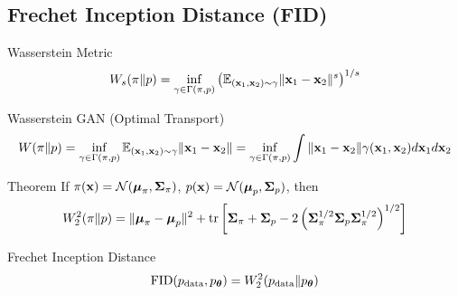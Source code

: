 \documentclass{beamer}
\begin{document}
\subsection{Frechet Inception Distance (FID)}
\begin{frame}{Wasserstein Metric}
	\vspace{-0.2cm}
	\[
		W_s(\pi \| p) = \inf_{\gamma \in \Gamma(\pi, p)} \left(\mathbb{E}_{(\mathbf{x}_1, \mathbf{x}_2) \sim \gamma} \| \mathbf{x}_1 - \mathbf{x}_2 \|^s\right)^{1/s}
	\]
	\eqpause
	\vspace{-0.3cm}
	\begin{block}{Wasserstein GAN (Optimal Transport)}
		\vspace{-0.5cm}
		{\small
		\[
			W(\pi \| p) = \inf_{\gamma \in \Gamma(\pi, p)} \mathbb{E}_{(\mathbf{x}_1, \mathbf{x}_2) \sim \gamma} \| \mathbf{x}_1 - \mathbf{x}_2 \| =  \inf_{\gamma\in {\Gamma(\pi, p)}} \int { \| \mathbf{x}_1 - \mathbf{x}_2 \|} {\gamma (\mathbf{x}_1, \mathbf{x}_2)} d \mathbf{x}_1 d \mathbf{x}_2
		\]
		}
		\vspace{-0.5cm}
	\end{block}
	\eqpause
	\begin{block}{Theorem}
		If $\pi(\mathbf{x}) = \mathcal{N}(\boldsymbol{\mu}_\pi, \boldsymbol{\Sigma}_\pi)$, $p(\mathbf{x}) = \mathcal{N}(\boldsymbol{\mu}_p, \boldsymbol{\Sigma}_p)$, then
		\vspace{-0.2cm}
		\[
			W_2^2(\pi \| p) = \| \boldsymbol{\mu}_{\pi} - \boldsymbol{\mu}_{p}\|^2 + \operatorname{tr} \left[ \boldsymbol{\Sigma}_{\pi} + \boldsymbol{\Sigma}_p - 2 \left(\boldsymbol{\Sigma}_{\pi}^{1/2} \boldsymbol{\Sigma}_p \boldsymbol{\Sigma}_{\pi}^{1/2} \right)^{1/2} \right]
		\]
		\vspace{-0.7cm}
	\end{block}
	\eqpause
	\begin{block}{Frechet Inception Distance}
		\vspace{-0.3cm}
		\[
			\mathrm{FID} (p_{\text{data}}, p_{\boldsymbol{\theta}}) =  W_2^2(p_{\text{data}} \| p_{\boldsymbol{\theta}})
		\]
		\vspace{-0.6cm}
	\end{block}
\end{frame}
\end{document}
